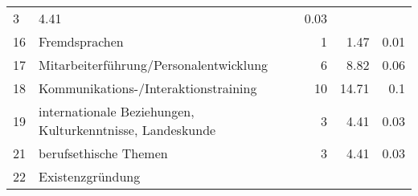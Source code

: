 \begin{longtable}{lXrrr}
       \num{3} &
       \num[round-mode=places,round-precision=2]{4,41} &
         \num[round-mode=places,round-precision=2]{0,03} \\

     16 &
     \multicolumn{1}{X}{ Fremdsprachen   } &


       \num{1} &
       \num[round-mode=places,round-precision=2]{1,47} &
         \num[round-mode=places,round-precision=2]{0,01} \\

     17 &
     \multicolumn{1}{X}{ Mitarbeiterführung/Personalentwicklung   } &


       \num{6} &
       \num[round-mode=places,round-precision=2]{8,82} &
         \num[round-mode=places,round-precision=2]{0,06} \\

     18 &
     \multicolumn{1}{X}{ Kommunikations-/Interaktionstraining   } &


       \num{10} &
       \num[round-mode=places,round-precision=2]{14,71} &
         \num[round-mode=places,round-precision=2]{0,1} \\

     19 &
     \multicolumn{1}{X}{ internationale Beziehungen, Kulturkenntnisse, Landeskunde   } &


       \num{3} &
       \num[round-mode=places,round-precision=2]{4,41} &
         \num[round-mode=places,round-precision=2]{0,03} \\

     21 &
     \multicolumn{1}{X}{ berufsethische Themen   } &


       \num{3} &
       \num[round-mode=places,round-precision=2]{4,41} &
         \num[round-mode=places,round-precision=2]{0,03} \\

     22 &
     \multicolumn{1}{X}{ Existenzgründung   } &



\end{longtable}
